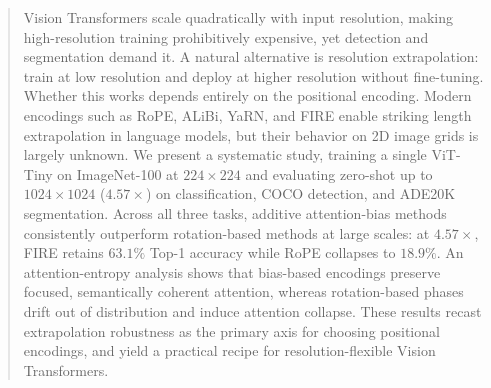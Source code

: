 \begin{abstract}
Vision Transformers scale quadratically with input resolution, making high-resolution training prohibitively expensive, yet detection and segmentation demand it. A natural alternative is resolution extrapolation: train at low resolution and deploy at higher resolution without fine-tuning. Whether this works depends entirely on the positional encoding. Modern encodings such as RoPE, ALiBi, YaRN, and FIRE enable striking length extrapolation in language models, but their behavior on 2D image grids is largely unknown. We present a systematic study, training a single ViT-Tiny on ImageNet-100 at $224\!\times\!224$ and evaluating zero-shot up to $1024\!\times\!1024$ ($4.57\times$) on classification, COCO detection, and ADE20K segmentation. Across all three tasks, additive attention-bias methods consistently outperform rotation-based methods at large scales: at $4.57\times$, FIRE retains $63.1\%$ Top-1 accuracy while RoPE collapses to $18.9\%$. An attention-entropy analysis shows that bias-based encodings preserve focused, semantically coherent attention, whereas rotation-based phases drift out of distribution and induce attention collapse. These results recast extrapolation robustness as the primary axis for choosing positional encodings, and yield a practical recipe for resolution-flexible Vision Transformers.
\end{abstract}
